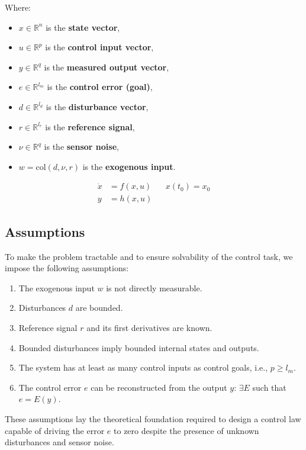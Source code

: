 \documentclass[]{report}
\begin{document}
Where:
\begin{itemize}
	\item $x \in \mathbb{R}^n$ is the \textbf{state vector},
	\item $u \in \mathbb{R}^p$ is the \textbf{control input vector},
	\item $y \in \mathbb{R}^q$ is the \textbf{measured output vector},
	\item $e \in \mathbb{R}^{l_m}$ is the \textbf{control error (goal)},
	\item $d \in \mathbb{R}^{l_d}$ is the \textbf{disturbance vector},
	\item $r \in \mathbb{R}^{l_r}$ is the \textbf{reference signal},
	\item $\nu \in \mathbb{R}^q$ is the \textbf{sensor noise},
	\item $w = \text{col}(d, \nu, r)$ is the \textbf{exogenous input}.
\end{itemize}
\begin{equation}
	\label{eq:FormulaA}
	\begin{aligned}
		\dot{x} &= f(x,u) && x(t_0) = x_0
\\
y &= h(x,u)
\end{aligned}
\end{equation}
\subsection*{Assumptions}

To make the problem tractable and to ensure solvability of the control task, we impose the following assumptions:

\begin{enumerate}
	\item The exogenous input $w$ is not directly measurable.
	\item Disturbances $d$ are bounded.
	\item Reference signal $r$ and its first derivatives are known.
	\item Bounded disturbances imply bounded internal states and outputs.
	\item The system has at least as many control inputs as control goals, i.e., $p \geq l_m$.
	\item The control error $e$ can be reconstructed from the output $y$: $\exists E$ such that $e = E(y)$.
\end{enumerate}

These assumptions lay the theoretical foundation required to design a control law capable of driving the error $e$ to zero despite the presence of unknown disturbances and sensor noise.
\end{document}

